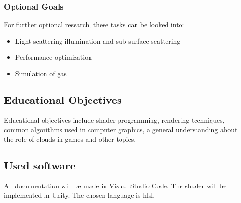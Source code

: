 \subsubsection{Optional Goals}
For further optional research, these tasks can be looked into:
\begin{itemize}
    \item Light scattering illumination and sub-surface scattering
    \item Performance optimization
    \item Simulation of gas
\end{itemize}

\subsection{Educational Objectives}
Educational objectives include shader programming, rendering techniques, common algorithms used in computer graphics, a general understanding about the role of clouds in games and other topics.

\subsection{Used software}
All documentation will be made in Visual Studio Code.
The shader will be implemented in Unity. The chosen language is \gls{hlsl}.